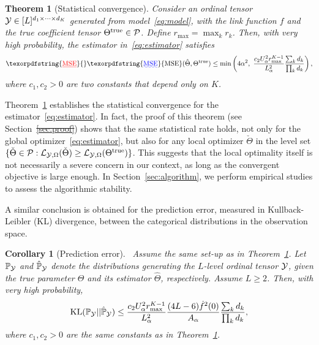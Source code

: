 \documentclass[11pt]{article}
\theoremstyle{plain}
\newtheorem{thm}{Theorem}[section]
\newtheorem{cor}{Corollary}[section] %
\theoremstyle{definition}
\providecommand{\DIFaddtex}[1]{{\protect\color{blue}\uwave{#1}}} %
\providecommand{\DIFdeltex}[1]{{\protect\color{red}\sout{#1}}}                      %
\providecommand{\DIFaddbegin}{} %
\providecommand{\DIFaddend}{} %
\providecommand{\DIFdelbegin}{} %
\providecommand{\DIFdelend}{} %
\providecommand{\DIFadd}[1]{\texorpdfstring{\DIFaddtex{#1}}{#1}} %
\providecommand{\DIFdel}[1]{\texorpdfstring{\DIFdeltex{#1}}{}} %
\begin{document}
\begin{thm}[Statistical convergence] \label{thm:rate}
Consider an ordinal tensor $\mathcal{Y}\in[L]^{d_1\times\dots\times d_K}$ generated from model~\eqref{eq:model}, with the link function $f$ and the true coefficient tensor $\Theta^{\text{true}}\in\mathcal{P}$. Define $r_{\max}=\max_k r_k$. Then, with very high probability, the estimator in~\eqref{eq:estimator} satisfies
\begin{equation}\label{eq:rate}
\DIFdelbegin \DIFdel{\text{MSE}}\DIFdelend \DIFaddbegin \DIFadd{\mathrm{MSE}}\DIFaddend (\hat \Theta, \trueT) \leq \min\left( 4\alpha^2,\ {c_2  U^2_\alpha r_{\max}^{K-1}  \over  L^2_\alpha } {\sum_kd_k\over  \prod_k d_k} \right),
\end{equation}
where $c_1, c_2>0$ are two constants that depend only on $K$.\DIFaddbegin \\
\DIFaddend \end{thm}
\DIFaddbegin 

\DIFaddend Theorem~\ref{thm:rate} establishes the statistical convergence for the estimator~\eqref{eq:estimator}. In fact, the proof of this theorem (see Section~\DIFdelbegin \DIFdel{\ref{sec:proof}}\DIFdelend \DIFaddbegin \DIFadd{\ref{sec:proofMSE}}\DIFaddend ) shows that the same statistical rate holds, not only for the global optimizer~\eqref{eq:estimator}, but also for any local optimizer $\check \Theta$ in the level set $\{\check\Theta\in\mathcal{P}: \mathcal{L}_{\mathcal{Y},\Omega}(\check\Theta)\geq \mathcal{L}_{\mathcal{Y},\Omega}(\Theta^{\text{true}})\}$. This suggests that the local optimality itself is not necessarily a severe concern in our context, as long as the convergent objective is large enough. In Section~\ref{sec:algorithm}, we perform empirical studies to assess the algorithmic stability.

A similar conclusion is obtained for the prediction error, measured in Kullback-Leibler (KL) divergence, between the categorical distributions in the observation space.
\DIFaddbegin 

\DIFaddend \begin{cor}[Prediction error]~\label{cor:prediction}
Assume the same set-up as in Theorem~\ref{thm:rate}. Let $\mathbb{P}_{\mathcal{Y}}$ and $\hat{\mathbb{P}}_{\mathcal{Y}}$ denote the distributions generating the $L$-level ordinal tensor $\mathcal{Y}$, given the true parameter $\Theta$ and its estimator $\hat \Theta$, respectively. Assume $L\geq 2$. Then, with very high probability,
\begin{equation}\label{eq:KLrate}
\text{KL}(\mathbb{P}_{\mathcal{Y}} || \hat{\mathbb{P}}_{\mathcal{Y}}) \leq  {c_2 U^2_\alpha r_{\max}^{K-1}  \over L^2_\alpha } {(4L-6)\dot{f}^2(0)  \over A_\alpha} {\sum_kd_k\over  \prod_k d_k},
\end{equation}
where $c_1, c_2>0$ are the same constants as in Theorem~\ref{thm:rate}.
\end{cor}
\DIFaddbegin 
\end{document}
